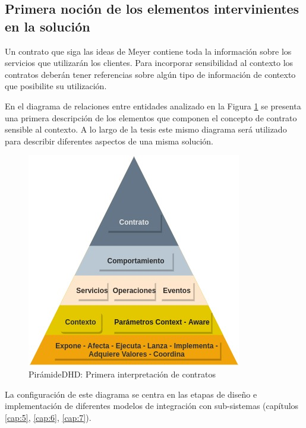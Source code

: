 \subsection{Primera noción de los elementos intervinientes en la solución}
\label{sec:elementoscontrato}

Un contrato que siga las ideas de Meyer contiene toda la información
sobre los servicios que utilizarán los clientes. Para incorporar sensibilidad
al contexto los contratos deberán tener referencias sobre algún tipo de
información de contexto que posibilite su utilización.

En el diagrama de relaciones entre entidades analizado en la Figura
\ref{fig:contratosv1} se presenta una primera descripción de los elementos
que componen el concepto de contrato sensible al contexto. A lo largo de la
tesis este mismo diagrama será utilizado para describir diferentes aspectos de
una misma solución. 


\begin{figure}[h]
\begin{center}
 \includegraphics[width=3.5 in,totalheight=3 in] {Ch0/PiramideDHD}
\caption{PirámideDHD: Primera interpretación de contratos}
\label{fig:contratosv1}
\end{center}
\end{figure}


La configuración de este diagrama se centra en las etapas de diseño e
implementación de diferentes modelos de integración con sub-sistemas
(capítulos \ref{cap:5}, \ref{cap:6},  \ref{cap:7}). 


